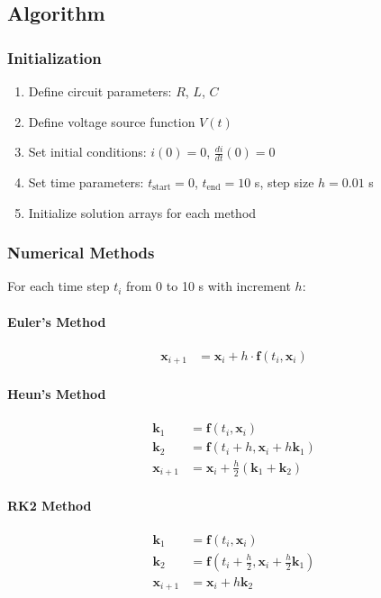 \documentclass[a4paper,12pt]{article}
\begin{document}
	\subsection{Algorithm}
	\subsubsection*{Initialization}
	\begin{enumerate}
		\item Define circuit parameters: $R$, $L$, $C$
		\item Define voltage source function $V(t)$
		\item Set initial conditions: $i(0) = 0$, $\frac{di}{dt}(0) = 0$
		\item Set time parameters: $t_{\text{start}} = 0$, $t_{\text{end}} = 10$ s, step size $h = 0.01$ s
		\item Initialize solution arrays for each method
	\end{enumerate}
	
	\subsubsection*{Numerical Methods}
	For each time step $t_i$ from 0 to 10 s with increment $h$:
	
	\paragraph{Euler's Method}
	\begin{align*}
		\mathbf{x}_{i+1} &= \mathbf{x}_i + h \cdot \mathbf{f}(t_i, \mathbf{x}_i)
	\end{align*}
	
	\paragraph{Heun's Method}
	\begin{align*}
		\mathbf{k}_1 &= \mathbf{f}(t_i, \mathbf{x}_i) \\
		\mathbf{k}_2 &= \mathbf{f}(t_i + h, \mathbf{x}_i + h\mathbf{k}_1) \\
		\mathbf{x}_{i+1} &= \mathbf{x}_i + \frac{h}{2}(\mathbf{k}_1 + \mathbf{k}_2)
	\end{align*}
	
	\paragraph{RK2 Method}
	\begin{align*}
		\mathbf{k}_1 &= \mathbf{f}(t_i, \mathbf{x}_i) \\
		\mathbf{k}_2 &= \mathbf{f}\left(t_i + \frac{h}{2}, \mathbf{x}_i + \frac{h}{2}\mathbf{k}_1\right) \\
		\mathbf{x}_{i+1} &= \mathbf{x}_i + h\mathbf{k}_2
	\end{align*}
	
\end{document}
